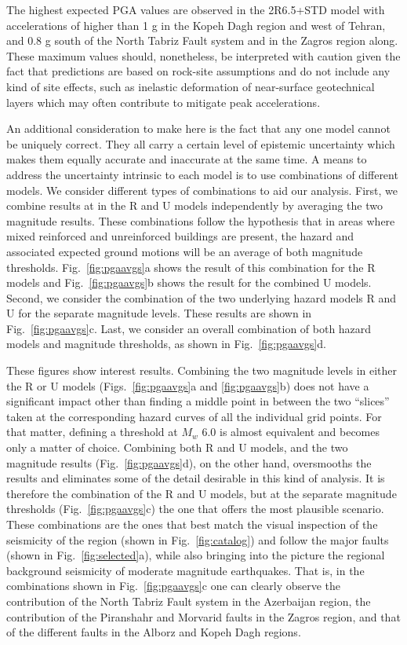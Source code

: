 The highest expected PGA values are observed in the 2R6.5+STD model with accelerations of higher than 1 g in the Kopeh Dagh region and west of Tehran, and 0.8 g south of the North Tabriz Fault system and in the Zagros region along. These maximum values should, nonetheless, be interpreted with caution given the fact that predictions are based on rock-site assumptions and do not include any kind of site effects, such as inelastic deformation of near-surface geotechnical layers which may often contribute to mitigate peak accelerations.

An additional consideration to make here is the fact that any one model cannot be uniquely correct. They all carry a certain level of epistemic uncertainty which makes them equally accurate and inaccurate at the same time. A means to address the uncertainty intrinsic to each model is to use combinations of different models. We consider different types of combinations to aid our analysis. First, we combine results at in the R and U models independently by averaging the two magnitude results. These combinations follow the hypothesis that in areas where mixed reinforced and unreinforced buildings are present, the hazard and associated expected ground motions will be an average of both magnitude thresholds. Fig.~\ref{fig:pgaavgs}a shows the result of this combination for the R models and Fig.~\ref{fig:pgaavgs}b shows the result for the combined U models. Second, we consider the combination of the two underlying hazard models R and U for the separate magnitude levels. These results are shown in Fig.~\ref{fig:pgaavgs}c. Last, we consider an overall combination of both hazard models and magnitude thresholds, as shown in Fig.~\ref{fig:pgaavgs}d.

These figures show interest results. Combining the two magnitude levels in either the R or U models (Figs.~\ref{fig:pgaavgs}a and \ref{fig:pgaavgs}b) does not have a significant impact other than finding a middle point in between the two ``slices'' taken at the corresponding hazard curves of all the individual grid points. For that matter, defining a threshold at $M_w$ 6.0 is almost equivalent and becomes only a matter of choice. Combining both R and U models, and the two magnitude results (Fig.~\ref{fig:pgaavgs}d), on the other hand, oversmooths the results and eliminates some of the detail desirable in this kind of analysis. It is therefore the combination of the R and U models, but at the separate magnitude thresholds (Fig.~\ref{fig:pgaavgs}c) the one that offers the most plausible scenario. These combinations are the ones that best match the visual inspection of the seismicity of the region (shown in Fig.~\ref{fig:catalog}) and follow the major faults (shown in Fig.~\ref{fig:selected}a), while also bringing into the picture the regional background seismicity of moderate magnitude earthquakes. That is, in the combinations shown in Fig.~\ref{fig:pgaavgs}c one can clearly observe the contribution of the North Tabriz Fault system in the Azerbaijan region, the contribution of the Piranshahr and Morvarid faults in the Zagros region, and that of the different faults in the Alborz and Kopeh Dagh regions. 

